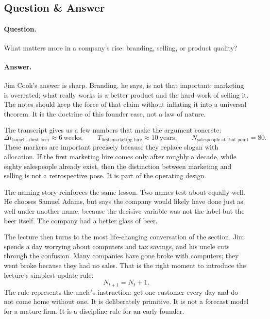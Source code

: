 \subsection{Question \& Answer}

\paragraph{Question.} What matters more in a company's rise: branding, selling, or product quality?

\paragraph{Answer.} Jim Cook's answer is sharp. Branding, he says, is not that important; marketing is overrated; what really works is a better product and the hard work of selling it. The notes should keep the force of that claim without inflating it into a universal theorem. It is the doctrine of this founder case, not a law of nature.

The transcript gives us a few numbers that make the argument concrete:
\begin{equation}
\Delta t_{\text{launch}\to\text{best beer}} \approx 6\ \text{weeks},
\qquad
T_{\text{first marketing hire}} \approx 10\ \text{years},
\qquad
N_{\text{salespeople at that point}} = 80.
\end{equation}
These markers are important precisely because they replace slogan with allocation. If the first marketing hire comes only after roughly a decade, while eighty salespeople already exist, then the distinction between marketing and selling is not a retrospective pose. It is part of the operating design.

The naming story reinforces the same lesson. Two names test about equally well. He chooses Samuel Adams, but says the company would likely have done just as well under another name, because the decisive variable was not the label but the beer itself. The company had a better glass of beer.

The lecture then turns to the most life-changing conversation of the section. Jim spends a day worrying about computers and tax savings, and his uncle cuts through the confusion. Many companies have gone broke with computers; they went broke because they had no sales. That is the right moment to introduce the lecture's simplest update rule:
\begin{equation}
N_{t+1}=N_t+1.
\end{equation}
The rule represents the uncle's instruction: get one customer every day and do not come home without one. It is deliberately primitive. It is not a forecast model for a mature firm. It is a discipline rule for an early founder.

